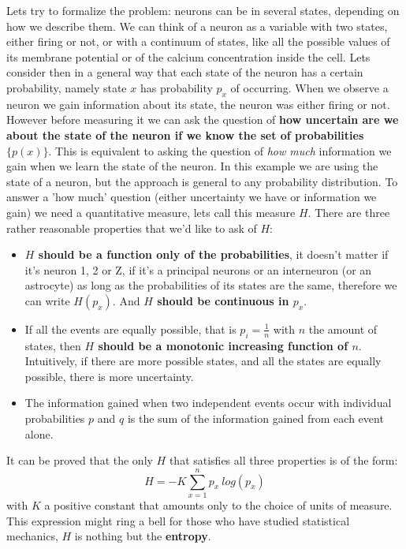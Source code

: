 Lets try to formalize the problem: neurons can be in several states, depending on how we describe them. 
We can think of a neuron as a variable with two states, either firing or not, or with a continuum of states, like all the possible values of its membrane potential or of the calcium concentration inside the cell.
Lets consider then in a general way that each state of the neuron has a certain probability, namely state $x$ has probability $p_x$ of occurring.
When we observe a neuron we gain information about its state, the neuron was either firing or not. 
However before measuring it we can ask the question of \textbf{how uncertain are we about the state of the neuron if we know the set of probabilities $\{p(x)\}$}.
This is equivalent to asking the question of \textit{how much} information we gain when we learn the state of the neuron. 
In this example we are using the state of a neuron, but the approach is general to any probability distribution.
To answer a 'how much' question (either uncertainty we have or information we gain) we need a quantitative measure, lets call this measure $H$.
There are three rather reasonable properties that we'd like to ask of $H$:
\begin{itemize}
    \item \textbf{$H$ should be a function only of the probabilities}, it doesn't matter if it's neuron 1, 2 or Z, if it's a principal neurons or an interneuron (or an astrocyte) as long as the probabilities of its states are the same, therefore we can write $H(p_x)$.
    And \textbf{$H$ should be continuous in $p_x$}.
    \item If all the events are equally possible, that is $p_i=\frac{1}{n}$ with $n$ the amount of states, then \textbf{$H$ should be a monotonic increasing function of $n$}.
    Intuitively, if there are more possible states, and all the states are equally possible, there is more uncertainty.
    \item The information gained when two independent events occur with individual probabilities $p$ and $q$ is the sum of the information gained from each event alone.
\end{itemize}
It can be proved that the only $H$ that satisfies all three properties is of the form: 
\begin{equation}
    H=-K \sum_{x=1}^n p_x\ log (p_x)
\end{equation}
with $K$ a positive constant that amounts only to the choice of units of measure.
This expression might ring a bell for those who have studied statistical mechanics, $H$ is nothing but the \textbf{entropy}. 
